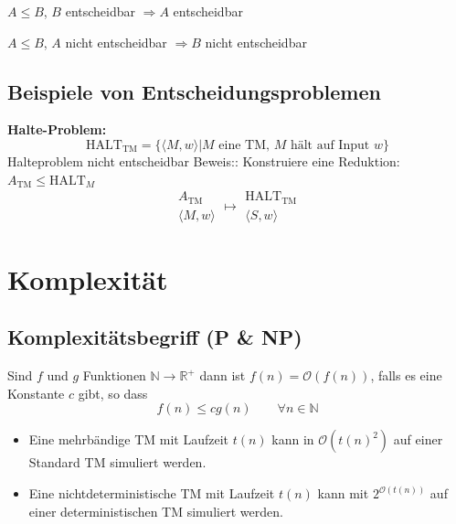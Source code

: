 \documentclass[a4paper]{article}
\begin{document}
	\begin{fsatz}
	$A \leq B$, $B$ entscheidbar $\Rightarrow A$ entscheidbar
	\end{fsatz}
	\begin{fsatz}
	$A \leq B$, $A$ nicht entscheidbar $\Rightarrow B$ nicht entscheidbar
	\end{fsatz}

\subsection{Beispiele von Entscheidungsproblemen}
	\textbf{Halte-Problem:}
	$$\text{HALT}_{\text{TM}} = \{ \langle M,w \rangle | M \text{ eine TM, } M \text{ hält auf Input } w \}$$
	Halteproblem nicht entscheidbar
	Beweis:: Konstruiere eine Reduktion: $A_{\text{TM}} \leq \text{HALT}_{M}$
	$$\substack{
		A_{\text{TM}}\\
		\langle M,w \rangle 
	} \longmapsto \substack{
		\text{HALT}_{\text{TM}}\\ 
		\langle S,w \rangle 
	}$$
	

	

\newpage
\section{Komplexität}


\subsection{Komplexitätsbegriff (P \& NP)}
	\begin{fdef}
	Sind $f$ und $g$ Funktionen $\mathbb{N} \rightarrow \mathbb{R}^+$ dann ist $f(n) = \mathcal{O}(f(n))$, falls es eine Konstante $c$ gibt, so dass
	$$f(n) \leq cg(n) \qquad \forall n \in \mathbb{N}$$
	\end{fdef}

	\begin{fmerke}
	\begin{itemize}
		\item Eine mehrbändige TM mit Laufzeit $t(n)$ kann in $\mathcal{O}(t(n)^2)$ auf einer Standard TM simuliert werden.
		\item Eine nichtdeterministische TM mit Laufzeit $t(n)$ kann mit $2^{\mathcal{O}(t(n))}$ auf einer deterministischen TM simuliert werden.
	\end{itemize}
	\end{fmerke}
\end{document}
